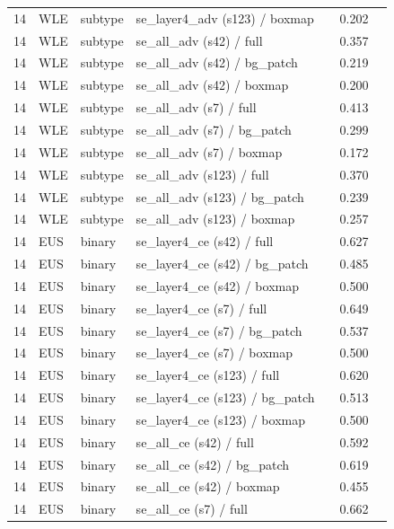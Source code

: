 \begin{longtable}{cL{1.1cm}L{1.5cm}L{5.6cm}ccc}
14 & WLE & subtype & se\_layer4\_adv (s123) / boxmap & \nl{} & 0.202 & \nl{} \\
14 & WLE & subtype & se\_all\_adv (s42) / full & \nl{} & 0.357 & \nl{} \\
14 & WLE & subtype & se\_all\_adv (s42) / bg\_patch & \nl{} & 0.219 & \nl{} \\
14 & WLE & subtype & se\_all\_adv (s42) / boxmap & \nl{} & 0.200 & \nl{} \\
14 & WLE & subtype & se\_all\_adv (s7) / full & \nl{} & 0.413 & \nl{} \\
14 & WLE & subtype & se\_all\_adv (s7) / bg\_patch & \nl{} & 0.299 & \nl{} \\
14 & WLE & subtype & se\_all\_adv (s7) / boxmap & \nl{} & 0.172 & \nl{} \\
14 & WLE & subtype & se\_all\_adv (s123) / full & \nl{} & 0.370 & \nl{} \\
14 & WLE & subtype & se\_all\_adv (s123) / bg\_patch & \nl{} & 0.239 & \nl{} \\
14 & WLE & subtype & se\_all\_adv (s123) / boxmap & \nl{} & 0.257 & \nl{} \\
14 & EUS & binary & se\_layer4\_ce (s42) / full & \nl{} & 0.627 & \nl{} \\
14 & EUS & binary & se\_layer4\_ce (s42) / bg\_patch & \nl{} & 0.485 & \nl{} \\
14 & EUS & binary & se\_layer4\_ce (s42) / boxmap & \nl{} & 0.500 & \nl{} \\
14 & EUS & binary & se\_layer4\_ce (s7) / full & \nl{} & 0.649 & \nl{} \\
14 & EUS & binary & se\_layer4\_ce (s7) / bg\_patch & \nl{} & 0.537 & \nl{} \\
14 & EUS & binary & se\_layer4\_ce (s7) / boxmap & \nl{} & 0.500 & \nl{} \\
14 & EUS & binary & se\_layer4\_ce (s123) / full & \nl{} & 0.620 & \nl{} \\
14 & EUS & binary & se\_layer4\_ce (s123) / bg\_patch & \nl{} & 0.513 & \nl{} \\
14 & EUS & binary & se\_layer4\_ce (s123) / boxmap & \nl{} & 0.500 & \nl{} \\
14 & EUS & binary & se\_all\_ce (s42) / full & \nl{} & 0.592 & \nl{} \\
14 & EUS & binary & se\_all\_ce (s42) / bg\_patch & \nl{} & 0.619 & \nl{} \\
14 & EUS & binary & se\_all\_ce (s42) / boxmap & \nl{} & 0.455 & \nl{} \\
14 & EUS & binary & se\_all\_ce (s7) / full & \nl{} & 0.662 & \nl{} \\

\end{longtable}
